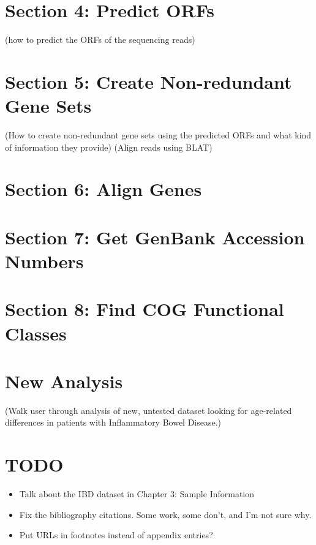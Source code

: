 \chapter{Section 4: Predict ORFs}
(how to predict the ORFs of the sequencing reads)

\chapter{Section 5: Create Non-redundant Gene Sets}
(How to create non-redundant gene sets using the predicted ORFs and what kind of information they provide)
(Align reads using BLAT)

\chapter{Section 6: Align Genes}

\chapter{Section 7: Get GenBank Accession Numbers}

\chapter{Section 8: Find COG Functional Classes}

\chapter{New Analysis}
(Walk user through analysis of new, untested dataset looking for age-related differences in patients with Inflammatory Bowel Disease.)

\chapter{TODO}
\begin{itemize}
    \item Talk about the IBD dataset in Chapter 3: Sample Information
    \item Fix the bibliography citations. Some work, some don't, and I'm not sure why.
    \item Put URLs in footnotes instead of appendix entries?
\end{itemize}

